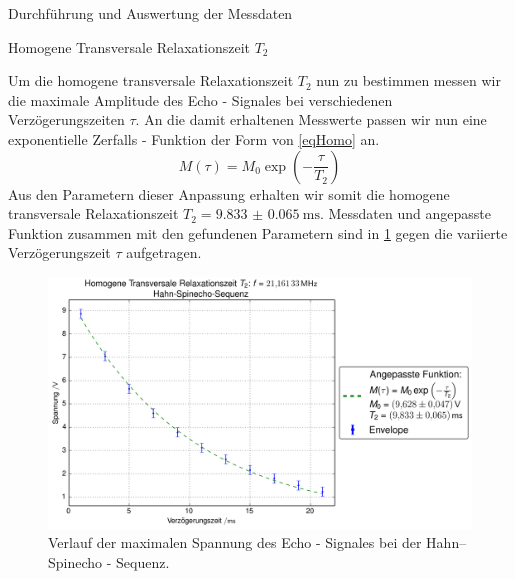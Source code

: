 \documentclass[pdftex, a4paper,11pt, twoside, ngerman]{report}
\begin{document}
\begin{chapter}{Durchführung und Auswertung der Messdaten}
\begin{section}{
        Homogene Transversale Relaxationszeit $T_{2}$}
\begin{subsection}
        Um die homogene transversale Relaxationszeit $T_{2}$ nun zu bestimmen
        messen wir die maximale Amplitude des Echo - Signales bei verschiedenen
        Verzögerungszeiten $\tau$.
        An die damit erhaltenen Messwerte passen wir nun eine exponentielle
        Zerfalls - Funktion der Form von \cref{eqHomo} an.
        \begin{equation}
          \label{eqHomo}
          M(\tau)=M_{0}\exp\left(-\frac{\tau}{T_{2}}\right)
        \end{equation}
        Aus den Parametern dieser Anpassung erhalten wir somit die homogene
        transversale Relaxationszeit $T_{2}=\SI{9.833(65)}{\milli\second}$.
        Messdaten und angepasste Funktion zusammen mit den gefundenen
        Parametern sind in \cref{figHahn} gegen die variierte Verzögerungszeit
        $\tau$ aufgetragen.
        \begin{figure}[htb]
          \centering
          \includegraphics[width=\textwidth]
          {Figures/HomoTransRelax_Hahn.png}
          \caption{Verlauf der maximalen Spannung des Echo - Signales bei der
            Hahn--Spinecho - Sequenz.}
          \label{figHahn}
        \end{figure}
        \begin{figure}[htb]
          \centering
          \begin{minipage}{.48\textwidth}
            \centering

\end{minipage}
\end{figure}
\end{subsection}
\end{section}
\end{chapter}
\end{document}
